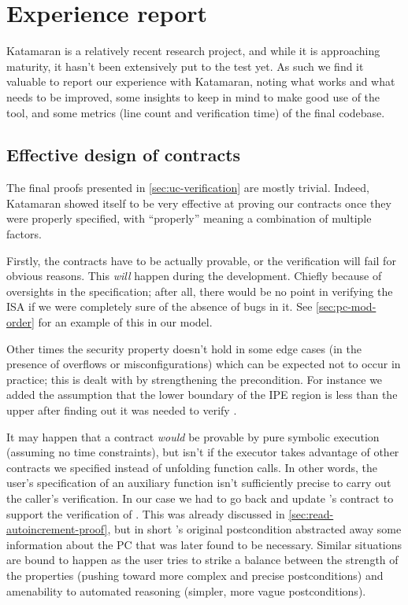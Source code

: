 \chapter{Experience report}
\label{ch:evaluation}

Katamaran is a relatively recent research project, and while it is approaching maturity, it hasn't been extensively put to the test yet. As such we find it valuable to report our experience with Katamaran, noting what works and what needs to be improved, some insights to keep in mind to make good use of the tool, and some metrics (line count and verification time) of the final codebase.

\section{Effective design of contracts}

The final proofs presented in \cref{sec:uc-verification} are mostly trivial. Indeed, Katamaran showed itself to be very effective at proving our contracts once they were properly specified, with ``properly'' meaning a combination of multiple factors.

Firstly, the contracts have to be actually provable, or the verification will fail for obvious reasons. This \emph{will} happen during the development. Chiefly because of oversights in the specification; after all, there would be no point in verifying the ISA if we were completely sure of the absence of bugs in it. See \cref{sec:pc-mod-order} for an example of this in our \msp model.

Other times the security property doesn't hold in some edge cases (\eg in the presence of overflows or misconfigurations) which can be expected not to occur in practice; this is dealt with by strengthening the precondition. For instance we added the assumption that the lower boundary of the IPE region is less than the upper after finding out it was needed to verify .

It may happen that a contract \emph{would} be provable by pure symbolic execution (assuming no time constraints), but isn't if the executor takes advantage of other contracts we specified instead of unfolding function calls. In other words, the user's specification of an auxiliary function isn't sufficiently precise to carry out the caller's verification. In our case we had to go back and update 's contract to support the verification of . This was already discussed in \cref{sec:read-autoincrement-proof}, but in short 's original postcondition abstracted away some information about the PC that was later found to be necessary. Similar situations are bound to happen as the user tries to strike a balance between the strength of the properties (pushing \eg toward more complex and precise postconditions) and amenability to automated reasoning (simpler, more vague postconditions).


